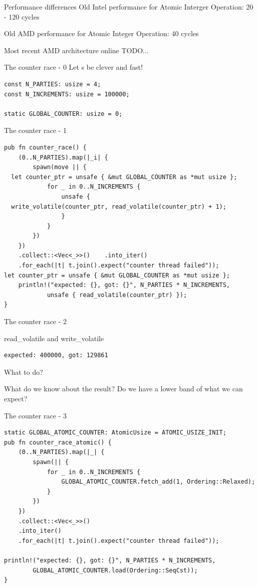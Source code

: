 \documentclass[10pt,aspectratio=169]{beamer}
\begin{document}
\begin{frame}{Performance differences}
    Old Intel performance for Atomic Interger Operation: 20 - 120 cycles

    Old AMD performance for Atomic Integer Operation: 40  cycles

    Most recent AMD architecture\cite{AMD64ArchVol1} online TODO...
\end{frame}


\begin{frame}[fragile]{The counter race - 0}
Let s be clever and fast!
\begin{verbatim}
const N_PARTIES: usize = 4;
const N_INCREMENTS: usize = 100000;

static GLOBAL_COUNTER: usize = 0;
\end{verbatim}
\end{frame}

\begin{frame}[fragile]{The counter race - 1}
\begin{verbatim}
pub fn counter_race() {
    (0..N_PARTIES).map(|_i| {
        spawn(move || {
  let counter_ptr = unsafe { &mut GLOBAL_COUNTER as *mut usize };
            for _ in 0..N_INCREMENTS {
                unsafe {
  write_volatile(counter_ptr, read_volatile(counter_ptr) + 1);
                }
            }
        })
    })
    .collect::<Vec<_>>()    .into_iter()
    .for_each(|t| t.join().expect("counter thread failed"));
let counter_ptr = unsafe { &mut GLOBAL_COUNTER as *mut usize };
    println!("expected: {}, got: {}", N_PARTIES * N_INCREMENTS,
            unsafe { read_volatile(counter_ptr) });
}
\end{verbatim}
\end{frame}

\begin{frame}[fragile]{The counter race - 2}

      \begin{alertblock}{read\_volatile and write\_volatile}
\begin{verbatim}
expected: 400000, got: 129861
\end{verbatim}
      \end{alertblock}

    What to do?

    What do we know about the result?
    Do we have a lower band of what we can expect?
\end{frame}


\begin{frame}[fragile]{The counter race - 3}
\begin{verbatim}
static GLOBAL_ATOMIC_COUNTER: AtomicUsize = ATOMIC_USIZE_INIT;
pub fn counter_race_atomic() {
    (0..N_PARTIES).map(|_| {
        spawn(|| {
            for _ in 0..N_INCREMENTS {
                GLOBAL_ATOMIC_COUNTER.fetch_add(1, Ordering::Relaxed);
            }
        })
    })
    .collect::<Vec<_>>()
    .into_iter()
    .for_each(|t| t.join().expect("counter thread failed"));

println!("expected: {}, got: {}", N_PARTIES * N_INCREMENTS,
        GLOBAL_ATOMIC_COUNTER.load(Ordering::SeqCst));
}
\end{verbatim}
\end{frame}
\end{document}
